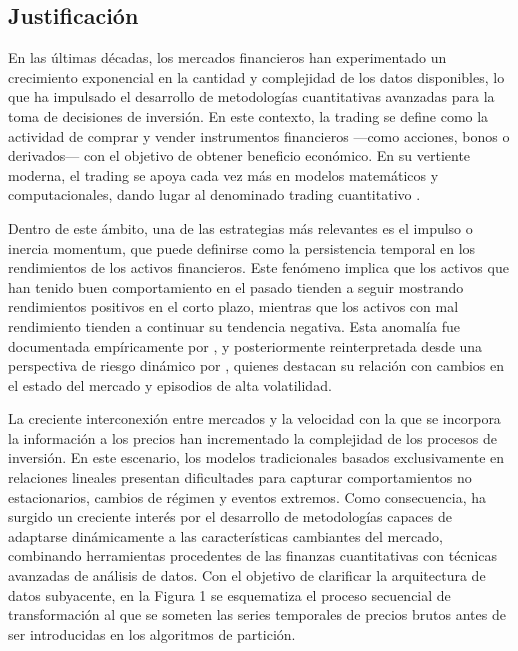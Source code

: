 \documentclass[
]{article}
\begin{document}
	
	\subsection{Justificación}\label{justificacion}
	
	En las últimas décadas, los mercados financieros han experimentado un crecimiento exponencial en la cantidad y complejidad de los datos disponibles, lo que ha impulsado el desarrollo de metodologías cuantitativas avanzadas para la toma de decisiones de inversión. En este contexto, la \gls{trading} se define como la actividad de comprar y vender instrumentos financieros —como acciones, bonos o derivados— con el objetivo de obtener beneficio económico. En su vertiente moderna, el \gls{trading} se apoya cada vez más en modelos matemáticos y computacionales, dando lugar al denominado \gls{trading} cuantitativo \parencite{lopezdeprado2018}.
	
	Dentro de este ámbito, una de las estrategias más relevantes es el impulso o inercia \gls{momentum}, que puede definirse como la persistencia temporal en los rendimientos de los activos financieros. Este fenómeno implica que los activos que han tenido buen comportamiento en el pasado tienden a seguir mostrando rendimientos positivos en el corto plazo, mientras que los activos con mal rendimiento tienden a continuar su tendencia negativa. Esta anomalía fue documentada empíricamente por \textcite{jegadeesh1993}, y posteriormente reinterpretada desde una perspectiva de riesgo dinámico por \textcite{daniel2016}, quienes destacan su relación con cambios en el estado del mercado y episodios de alta volatilidad.
	
	La creciente interconexión entre mercados y la velocidad con la que se incorpora la información a los precios han incrementado la complejidad de los procesos de inversión. En este escenario, los modelos tradicionales basados exclusivamente en relaciones lineales presentan dificultades para capturar comportamientos no estacionarios, cambios de régimen y eventos extremos. Como consecuencia, ha surgido un creciente interés por el desarrollo de metodologías capaces de adaptarse dinámicamente a las características cambiantes del mercado, combinando herramientas procedentes de las finanzas cuantitativas con técnicas avanzadas de análisis de datos. Con el objetivo de clarificar la arquitectura de datos subyacente, en la Figura 1 se esquematiza el proceso secuencial de transformación al que se someten las series temporales de precios brutos antes de ser introducidas en los algoritmos de partición.
	
\end{document}
